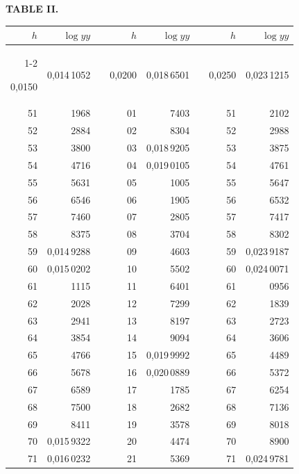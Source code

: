 \endgroup
{}
\clearpage
{}
\begingroup
\centering
\fontsize{9}{9}\selectfont
\setlength{\tabcolsep}{8pt}
\renewcommand{\arraystretch}{1}
\setlength{\parskip}{0pt}
\textbf{TABLE II.}
\par\vspace{7pt}
\begin{tabular}{|r|r|@{}p{9pt}@{}|r|r|@{}p{9pt}@{}|r|r|}
\hline
\rule{0pt}{8.5pt}\(h\) & \(\log yy\) & & \(h\) & \(\log yy\) & & \(h\) & \(\log yy\) \\
\cline{1-2}\cline{4-5}\cline{7-8}
\rule{0pt}{8.5pt}0,0150 & 0,014\,1052 &  & 0,0200 & 0,018\,6501 &  & 0,0250 & 0,023\,1215 \\
51 & 1968 &  & 01 & 7403 &  & 51 & 2102 \\
52 & 2884 &  & 02 & 8304 &  & 52 & 2988 \\
53 & 3800 &  & 03 & 0,018\,9205 &  & 53 & 3875 \\
54 & 4716 &  & 04 & 0,019\,0105 &  & 54 & 4761 \\
55 & 5631 &  & 05 & 1005 &  & 55 & 5647 \\[3pt]
56 & 6546 &  & 06 & 1905 &  & 56 & 6532 \\
57 & 7460 &  & 07 & 2805 &  & 57 & 7417 \\
58 & 8375 &  & 08 & 3704 &  & 58 & 8302 \\
59 & 0,014\,9288 &  & 09 & 4603 &  & 59 & 0,023\,9187 \\
60 & 0,015\,0202 &  & 10 & 5502 &  & 60 & 0,024\,0071 \\[3pt]
61 & 1115 &  & 11 & 6401 &  & 61 & 0956 \\
62 & 2028 &  & 12 & 7299 &  & 62 & 1839 \\
63 & 2941 &  & 13 & 8197 &  & 63 & 2723 \\
64 & 3854 &  & 14 & 9094 &  & 64 & 3606 \\
65 & 4766 &  & 15 & 0,019\,9992 &  & 65 & 4489 \\[3pt]
66 & 5678 &  & 16 & 0,020\,0889 &  & 66 & 5372 \\
67 & 6589 &  & 17 & 1785 &  & 67 & 6254 \\
68 & 7500 &  & 18 & 2682 &  & 68 & 7136 \\
69 & 8411 &  & 19 & 3578 &  & 69 & 8018 \\
70 & 0,015\,9322 &  & 20 & 4474 &  & 70 & 8900 \\[3pt]
71 & 0,016\,0232 &  & 21 & 5369 &  & 71 & 0,024\,9781 \\

\end{tabular}
